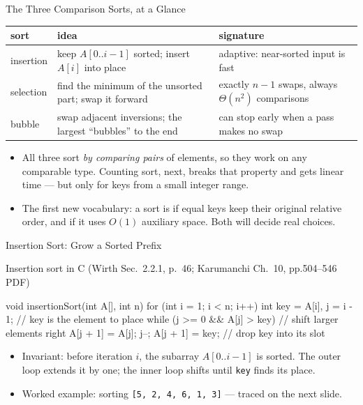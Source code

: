 \documentclass[aspectratio=169]{beamer}
\begin{document}
\begin{frame}{The Three Comparison Sorts, at a Glance}
  \begin{center}
  {\footnotesize
  \begin{tabular}{p{2.6cm} p{4.6cm} p{4.6cm}}
    \toprule
    \textbf{sort} & \textbf{idea} & \textbf{signature} \\
    \midrule
    insertion & keep $A[0..i-1]$ sorted; insert $A[i]$ into place &
      adaptive: near-sorted input is fast \\
    selection & find the minimum of the unsorted part; swap it forward &
      exactly $n-1$ swaps, always $\Theta(n^2)$ comparisons \\
    bubble & swap adjacent inversions; the largest ``bubbles'' to the end &
      can stop early when a pass makes no swap \\
    \bottomrule
  \end{tabular}}
  \end{center}
  \begin{itemize}
    \item All three sort \emph{by comparing pairs} of elements, so they work
      on any comparable type. Counting sort, next, breaks that property and
      gets linear time --- but only for keys from a small integer range.
    \item The first new vocabulary: a sort is  if equal keys keep
      their original relative order, and  if it uses $O(1)$
      auxiliary space. Both will decide real choices.
  \end{itemize}
\end{frame}

\begin{frame}[fragile]{Insertion Sort: Grow a Sorted Prefix}
  \footnotesize
  \begin{block}{Insertion sort in C (Wirth Sec.~2.2.1, p.~46; Karumanchi
    Ch.~10, pp.504--546 PDF)
    \cite{Wirth2004_algorithms_data_structures,Karumanchi2017_data_structures_algorithms_made_easy}}
\begin{semiverbatim}
void insertionSort(int A[], int n) {
  for (int i = 1; i < n; i++) {
    int key = A[i], j = i - 1;         // key is the element to place
    while (j >= 0 && A[j] > key) {     // shift larger elements right
      A[j + 1] = A[j];
      j--;
    }
    A[j + 1] = key;                    // drop key into its slot
  }
}
\end{semiverbatim}
  \end{block}
  \begin{itemize}
    \item Invariant: before iteration $i$, the subarray $A[0..i-1]$ is
      sorted. The outer loop extends it by one; the inner loop shifts until
      \texttt{key} finds its place.
    \item Worked example: sorting \texttt{[5, 2, 4, 6, 1, 3]} --- traced on
      the next slide.
  \end{itemize}
\end{frame}
\end{document}
